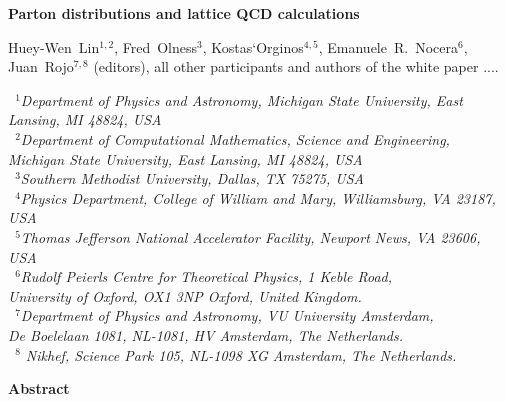 \documentclass[11pt,a4paper]{article}
\begin{document}
\vspace{.5cm}

\begin{center}
{\Large \bf Parton distributions and lattice QCD calculations}
\vspace{.7cm}

Huey-Wen~Lin$^{1,2}$, Fred~Olness$^3$, Kostas`Orginos$^{4,5}$,
Emanuele~R.~Nocera$^6$, Juan~Rojo$^{7,8}$ (editors),
all other participants and authors of the white paper ....


\vspace{.3cm}
{\it \small
~$^{1}$Department of Physics and Astronomy, Michigan State University, East Lansing, MI 48824, USA\\
~$^{2}$Department of Computational Mathematics, Science and Engineering, \\Michigan State University, East Lansing, MI 48824, USA\\
~$^{3}$Southern Methodist University, Dallas, TX 75275, USA\\
~$^{4}$Physics Department, College of William and Mary, Williamsburg, VA 23187, USA\\
~$^{5}$Thomas Jefferson National Accelerator Facility, Newport News, VA 23606, USA\\
~$^6$Rudolf Peierls Centre for Theoretical Physics, 1 Keble Road,\\ University of Oxford, OX1 3NP Oxford, United Kingdom.\\
~$^{7}$Department of Physics and Astronomy, VU University Amsterdam,\\
De Boelelaan 1081, NL-1081, HV Amsterdam, The Netherlands.\\
~$^{8}$ Nikhef, Science Park 105, NL-1098 XG Amsterdam, The Netherlands.\\        
}

\vspace{0.8cm}

{\bf \large Abstract}


\end{center}
\end{document}
